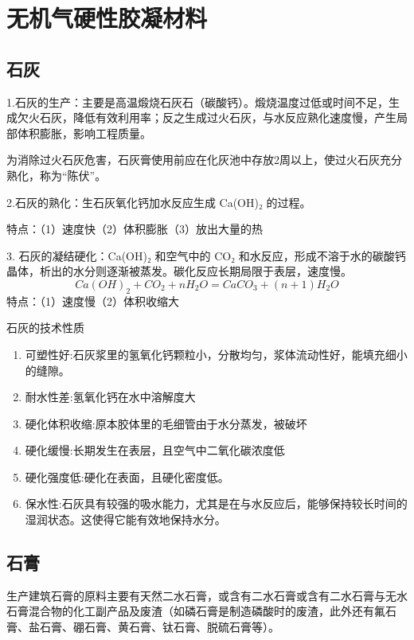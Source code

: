 \documentclass[12pt, a4paper, oneside, UTF8]{ctexbook}
\begin{document}
% 
\else
\fi

\chapter{无机气硬性胶凝材料}

\section{石灰}

1.石灰的生产：主要是高温煅烧石灰石（碳酸钙）。煅烧温度过低或时间不足，生成欠火石灰，降低有效利用率；反之生成过火石灰，与水反应熟化速度慢，产生局部体积膨胀，影响工程质量。

为消除过火石灰危害，石灰膏使用前应在化灰池中存放2周以上，使过火石灰充分熟化，称为“陈伏”。

2.石灰的熟化：生石灰氧化钙加水反应生成 Ca(OH)₂ 的过程。

特点：（1）速度快（2）体积膨胀（3）放出大量的热

3. 石灰的凝结硬化：Ca(OH)₂ 和空气中的 CO₂ 和水反应，形成不溶于水的碳酸钙晶体，析出的水分则逐渐被蒸发。碳化反应长期局限于表层，速度慢。
$$Ca(OH)_2 + CO_2 + nH_2O = CaCO_3 + (n+1)H_2O$$
特点：（1）速度慢（2）体积收缩大

\begin{remark}
    石灰的技术性质
    \begin{enumerate}
        \item 可塑性好:石灰浆里的氢氧化钙颗粒小，分散均匀，浆体流动性好，能填充细小的缝隙。
        \item 耐水性差:氢氧化钙在水中溶解度大
        \item 硬化体积收缩:原本胶体里的毛细管由于水分蒸发，被破坏
        \item 硬化缓慢:长期发生在表层，且空气中二氧化碳浓度低
        \item 硬化强度低:硬化在表面，且硬化密度低。
        \item 保水性:石灰具有较强的吸水能力，尤其是在与水反应后，能够保持较长时间的湿润状态。这使得它能有效地保持水分。
    \end{enumerate}
\end{remark}

\section{石膏}

生产建筑石膏的原料主要有天然二水石膏，或含有二水石膏或含有二水石膏与无水石膏混合物的化工副产品及废渣（如磷石膏是制造磷酸时的废渣，此外还有氟石膏、盐石膏、硼石膏、黄石膏、钛石膏、脱硫石膏等）。
\end{document}
